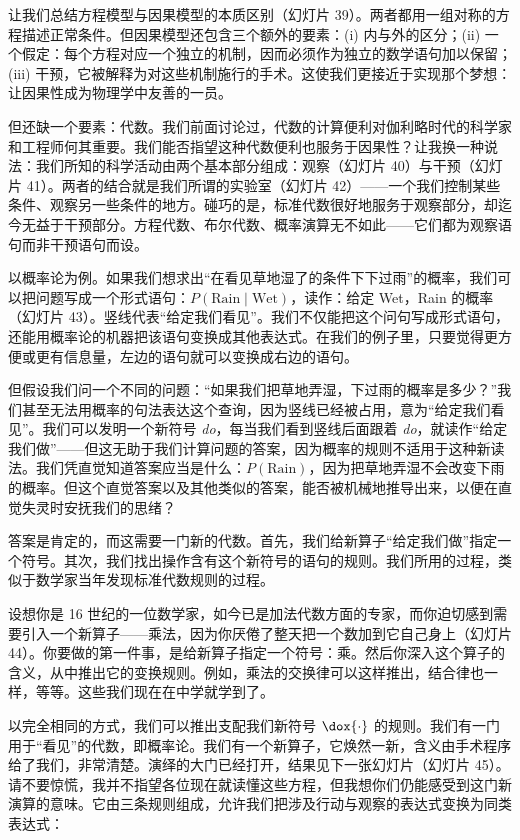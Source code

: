 让我们总结方程模型与因果模型的本质区别（幻灯片 39）。两者都用一组对称的方程描述正常条件。但因果模型还包含三个额外的要素：(i) 内与外的区分；(ii) 一个假定：每个方程对应一个独立的机制，因而必须作为独立的数学语句加以保留；(iii) 干预，它被解释为对这些机制施行的手术。这使我们更接近于实现那个梦想：让因果性成为物理学中友善的一员。

但还缺一个要素：代数。我们前面讨论过，代数的计算便利对伽利略时代的科学家和工程师何其重要。我们能否指望这种代数便利也服务于因果性？让我换一种说法：我们所知的科学活动由两个基本部分组成：观察（幻灯片 40）与干预（幻灯片 41）。两者的结合就是我们所谓的实验室（幻灯片 42）——一个我们控制某些条件、观察另一些条件的地方。碰巧的是，标准代数很好地服务于观察部分，却迄今无益于干预部分。方程代数、布尔代数、概率演算无不如此——它们都为观察语句而非干预语句而设。

以概率论为例。如果我们想求出“在看见草地湿了的条件下下过雨”的概率，我们可以把问题写成一个形式语句：$P(\text{Rain}\mid\text{Wet})$，读作：给定 Wet，Rain 的概率（幻灯片 43）。竖线代表“给定我们看见”。我们不仅能把这个问句写成形式语句，还能用概率论的机器把该语句变换成其他表达式。在我们的例子里，只要觉得更方便或更有信息量，左边的语句就可以变换成右边的语句。

但假设我们问一个不同的问题：“如果我们把草地弄湿，下过雨的概率是多少？”我们甚至无法用概率的句法表达这个查询，因为竖线已经被占用，意为“给定我们看见”。我们可以发明一个新符号 \textit{do}，每当我们看到竖线后面跟着 \textit{do}，就读作“给定我们做”——但这无助于我们计算问题的答案，因为概率的规则不适用于这种新读法。我们凭直觉知道答案应当是什么：$P(\text{Rain})$，因为把草地弄湿不会改变下雨的概率。但这个直觉答案以及其他类似的答案，能否被机械地推导出来，以便在直觉失灵时安抚我们的思绪？

答案是肯定的，而这需要一门新的代数。首先，我们给新算子“给定我们做”指定一个符号。其次，我们找出操作含有这个新符号的语句的规则。我们所用的过程，类似于数学家当年发现标准代数规则的过程。

设想你是 16 世纪的一位数学家，如今已是加法代数方面的专家，而你迫切感到需要引入一个新算子——乘法，因为你厌倦了整天把一个数加到它自己身上（幻灯片 44）。你要做的第一件事，是给新算子指定一个符号：乘。然后你深入这个算子的含义，从中推出它的变换规则。例如，乘法的交换律可以这样推出，结合律也一样，等等。这些我们现在在中学就学到了。

以完全相同的方式，我们可以推出支配我们新符号 $\dox{\cdot}$ 的规则。我们有一门用于“看见”的代数，即概率论。我们有一个新算子，它焕然一新，含义由手术程序给了我们，非常清楚。演绎的大门已经打开，结果见下一张幻灯片（幻灯片 45）。请不要惊慌，我并不指望各位现在就读懂这些方程，但我想你们仍能感受到这门新演算的意味。它由三条规则组成，允许我们把涉及行动与观察的表达式变换为同类表达式：

